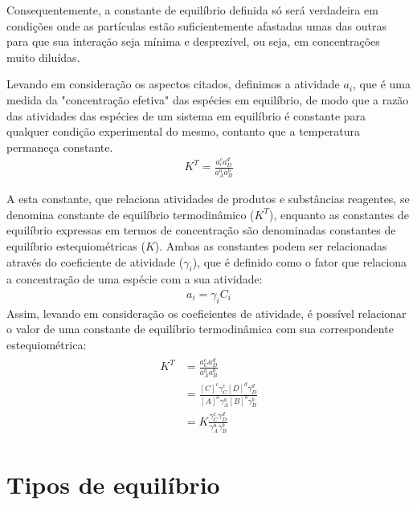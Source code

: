 Consequentemente, a constante de equilíbrio definida só será verdadeira em condições onde as partículas estão suficientemente afastadas umas das outras para que sua interação seja mínima e desprezível, ou seja, em concentrações muito diluídas.

\begin{definition}
    Levando em consideração os aspectos citados, definimos a atividade $a_i$, que é uma medida da "concentração efetiva" das espécies em equilíbrio, de modo que a razão das atividades das espécies de um sistema em equilíbrio é constante para qualquer condição experimental do mesmo, contanto que a temperatura permaneça constante.
    \begin{gather}
        K^T = \frac{a_c^c a_D^d}{a_A^a a_B^b}
    \end{gather}

    A esta constante, que relaciona atividades de produtos e substâncias reagentes, se denomina constante de equilíbrio termodinâmico ($K^T$), enquanto as constantes de equilíbrio expressas em termos de concentração são denominadas constantes de equilíbrio estequiométricas ($K$). Ambas as constantes podem ser relacionadas através do coeficiente de atividade ($\gamma_i$), que é definido como o fator que relaciona a concentração de uma espécie com a sua atividade:
    \begin{gather}
        a_i = \gamma_i C_i
    \end{gather}
    Assim, levando em consideração os coeficientes de atividade, é possível relacionar o valor de uma constante de equilíbrio termodinâmica com sua correspondente estequiométrica:
    \begin{gather}
        \begin{align}
            K^T & = \frac{a_C^c a_D^d}{a_A^a a_B^b}                                             \\
                & = \frac{[C]^c \gamma_C^c [D]^d \gamma_D^d}{[A]^a \gamma_A^a [B]^b \gamma_B^b} \\
                & = K \frac{\gamma_C^c \gamma_D^d}{\gamma_A^a \gamma_B^b}
        \end{align}
    \end{gather}
\end{definition}

\section*{Tipos de equilíbrio}

